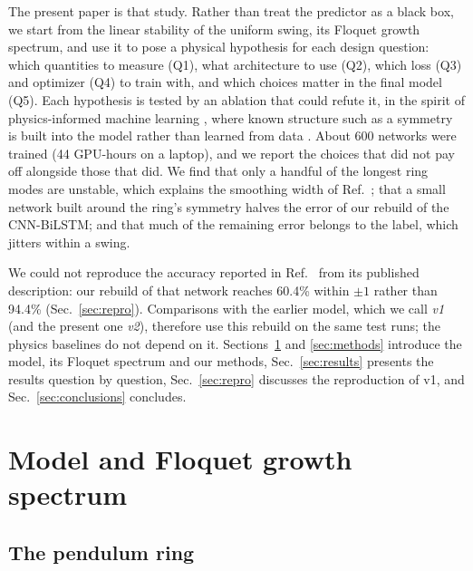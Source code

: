 \documentclass[11pt]{article}
\begin{document}
The present paper is that study. Rather than treat the predictor as a black box, we start from the linear stability of the uniform swing, its Floquet growth spectrum, and use it to pose a physical hypothesis for each design question: which quantities to measure (Q1), what architecture to use (Q2), which loss (Q3) and optimizer (Q4) to train with, and which choices matter in the final model (Q5). Each hypothesis is tested by an ablation that could refute it, in the spirit of physics-informed machine learning \cite{karniadakis2021physics}, where known structure such as a symmetry is built into the model rather than learned from data \cite{cohen2016group}. About 600 networks were trained (44 GPU-hours on a laptop), and we report the choices that did not pay off alongside those that did. We find that only a handful of the longest ring modes are unstable, which explains the smoothing width of Ref.~\cite{mittal2026jand}; that a small network built around the ring's symmetry halves the error of our rebuild of the CNN-BiLSTM; and that much of the remaining error belongs to the label, which jitters within a swing.

We could not reproduce the accuracy reported in Ref.~\cite{mittal2026jand} from its published description: our rebuild of that network reaches 60.4\% within $\pm1$ rather than 94.4\% (Sec.~\ref{sec:repro}). Comparisons with the earlier model, which we call \emph{v1} (and the present one \emph{v2}), therefore use this rebuild on the same test runs; the physics baselines do not depend on it. Sections~\ref{sec:model} and \ref{sec:methods} introduce the model, its Floquet spectrum and our methods, Sec.~\ref{sec:results} presents the results question by question, Sec.~\ref{sec:repro} discusses the reproduction of v1, and Sec.~\ref{sec:conclusions} concludes.

\section{Model and Floquet growth spectrum}
\label{sec:model}

\subsection{The pendulum ring}
\end{document}
